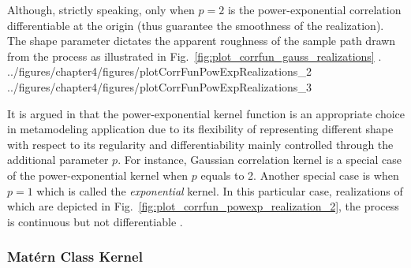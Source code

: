 Although, strictly speaking, only when $p = 2$ is the power-exponential correlation differentiable at the origin (thus guarantee the smoothness of the realization).
The shape parameter dictates the apparent roughness of the sample path drawn from the process as illustrated in Fig.~\ref{fig:plot_corrfun_gauss_realizations} \cite{Rasmussen2006}.
{../figures/chapter4/figures/plotCorrFunPowExpRealizations_2}
{../figures/chapter4/figures/plotCorrFunPowExpRealizations_3}

It is argued in \cite{Marrel2008} that the power-exponen\-tial kernel function is an appropriate choice in metamodeling application due to its flexibility of representing different shape with respect to its regularity and differentiability mainly controlled through the additional parameter $p$.
For instance, Gaussian correlation kernel is a special case of the power-exponential kernel when $p$ equals to 2. 
Another special case is when $p = 1$ which is called the \emph{exponential} kernel.
In this particular case, realizations of which are depicted in Fig.~\ref{fig:plot_corrfun_powexp_realization_2}, the process is continuous but not differentiable \cite{Rasmussen2006}.

\subsubsection{Mat\'ern Class Kernel}\label{subsub:gp_matern_cov}

